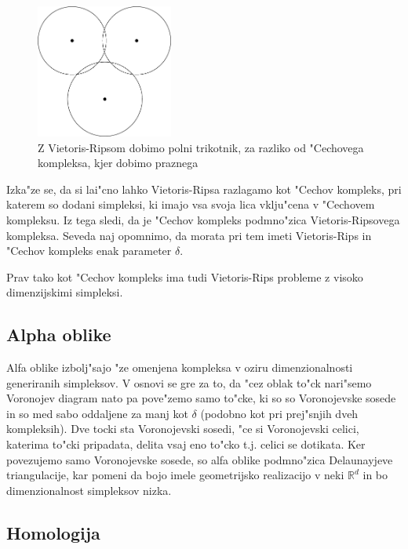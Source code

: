 \documentclass[11pt]{article}
\begin{document}
\begin{figure}[!htb]
    \centering
    \includegraphics[width=0.4\textwidth]{vrdiag.png}
    \caption{Z Vietoris-Ripsom dobimo polni trikotnik, za razliko od "Cechovega kompleksa, kjer dobimo praznega}
    \label{fig:vrdiag}
\end{figure}

Izka"ze se, da si lai"cno lahko Vietoris-Ripsa razlagamo kot "Cechov kompleks, pri katerem so dodani simpleksi, ki imajo vsa svoja lica vklju"cena v "Cechovem kompleksu. Iz tega sledi, da je "Cechov kompleks podmno"zica Vietoris-Ripsovega kompleksa. Seveda naj opomnimo, da morata pri tem imeti Vietoris-Rips in "Cechov kompleks enak parameter $\delta$. 

Prav tako kot "Cechov kompleks ima tudi Vietoris-Rips probleme z visoko dimenzijskimi simpleksi.

\subsection{Alpha oblike}

Alfa oblike izbolj"sajo "ze omenjena kompleksa v oziru dimenzionalnosti generiranih simpleksov. V osnovi se gre za to, da "cez oblak to"ck nari"semo Voronojev diagram nato pa pove"zemo samo to"cke, ki so so Voronojevske sosede in so med sabo oddaljene za manj kot $\delta$ (podobno kot pri prej"snjih dveh kompleksih). Dve tocki sta Voronojevski sosedi, "ce si Voronojevski celici, katerima to"cki pripadata, delita vsaj eno to"cko t.j. celici se dotikata. Ker povezujemo samo Voronojevske sosede, so alfa oblike podmno"zica Delaunayjeve triangulacije, kar pomeni da bojo imele geometrijsko realizacijo v neki $\mathbb{R}^{d}$ in bo dimenzionalnost simpleksov nizka.\cite{Edelsbrunner:1994:TAS:174462.156635}\cite{CGF:CGF178}

\subsection{Homologija}
\end{document}
